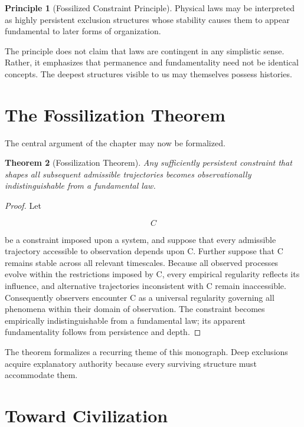 \documentclass[11pt,oneside]{book}
\theoremstyle{plain}
\newtheorem{theorem}{Theorem}[chapter]
\theoremstyle{definition}
\newtheorem{principle}[theorem]{Principle}
\theoremstyle{remark}
\begin{document}
\begin{principle}[Fossilized Constraint Principle]
Physical laws may be interpreted as highly persistent exclusion structures whose stability causes them to appear fundamental to later forms of organization.
\end{principle}

The principle does not claim that laws are contingent in any simplistic sense. Rather, it emphasizes that permanence and fundamentality need not be identical concepts. The deepest structures visible to us may themselves possess histories.

\section{The Fossilization Theorem}

The central argument of the chapter may now be formalized.

\begin{theorem}[Fossilization Theorem]
Any sufficiently persistent constraint that shapes all subsequent admissible trajectories becomes observationally indistinguishable from a fundamental law.
\end{theorem}

\begin{proof}
Let

\begin{equation}
C
\end{equation}

be a constraint imposed upon a system, and suppose that every admissible trajectory accessible to observation depends upon C. Further suppose that C remains stable across all relevant timescales. Because all observed processes evolve within the restrictions imposed by C, every empirical regularity reflects its influence, and alternative trajectories inconsistent with C remain inaccessible. Consequently observers encounter C as a universal regularity governing all phenomena within their domain of observation. The constraint becomes empirically indistinguishable from a fundamental law; its apparent fundamentality follows from persistence and depth.
\end{proof}

The theorem formalizes a recurring theme of this monograph. Deep exclusions acquire explanatory authority because every surviving structure must accommodate them.

\section{Toward Civilization}
\end{document}
